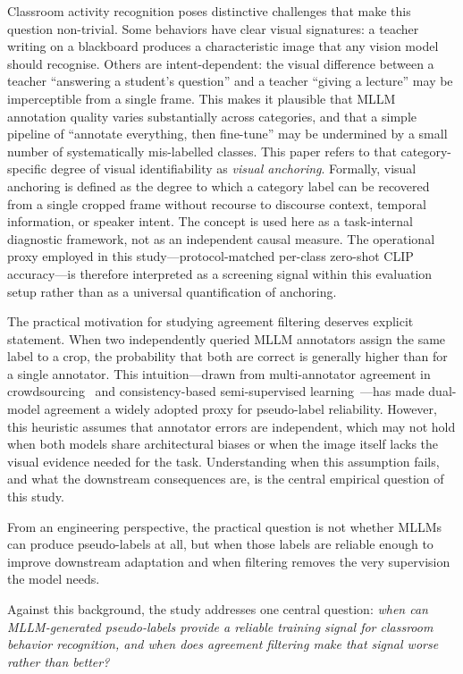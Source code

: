 \documentclass{ieeeaccess}
\begin{document}
Classroom activity recognition poses distinctive challenges that
make this question non-trivial.
Some behaviors have clear visual signatures: a teacher writing on a
blackboard produces a characteristic image that any vision model should
recognise.
Others are intent-dependent: the visual difference between a teacher
``answering a student's question'' and a teacher ``giving a lecture''
may be imperceptible from a single frame.
This makes it plausible that MLLM annotation quality varies
substantially across categories, and that a simple pipeline of
``annotate everything, then fine-tune'' may be undermined by a small
number of systematically mis-labelled classes.
This paper refers to that category-specific degree of visual
identifiability as \emph{visual anchoring}.
Formally, visual anchoring is defined as the degree to which a
category label can be recovered from a single cropped frame without
recourse to discourse context, temporal information, or speaker intent.
The concept is used here as a task-internal diagnostic framework, not
as an independent causal measure.
The operational proxy employed in this study---protocol-matched per-class
zero-shot CLIP accuracy---is therefore interpreted as a screening signal
within this evaluation setup rather than as a universal quantification
of anchoring.

The practical motivation for studying agreement filtering deserves
explicit statement.
When two independently queried MLLM annotators assign the same label
to a crop, the probability that both are correct is generally higher
than for a single annotator.
This intuition---drawn from multi-annotator agreement in
crowdsourcing~\cite{snow2008cheap} and consistency-based semi-supervised
learning~\cite{laine2016temporal}---has made dual-model agreement a widely
adopted proxy for pseudo-label reliability.
However, this heuristic assumes that annotator errors are independent,
which may not hold when both models share architectural biases or
when the image itself lacks the visual evidence needed for the task.
Understanding when this assumption fails, and what the downstream
consequences are, is the central empirical question of this study.

From an engineering perspective, the practical question is not whether
MLLMs can produce pseudo-labels at all, but when those labels are
reliable enough to improve downstream adaptation and when filtering
removes the very supervision the model needs.

Against this background, the study addresses one central question:
\emph{when can MLLM-generated pseudo-labels provide a reliable training
signal for classroom behavior recognition, and when does agreement
filtering make that signal worse rather than better?}
\end{document}
